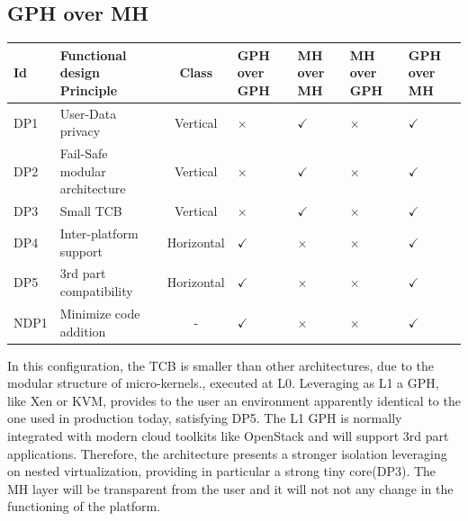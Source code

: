 \documentclass{sig-alternate}
\begin{document}
\subsection{GPH over MH}

\label{par:gom}

\begin{table}
\label{fin:conf}
\centering
\begin{tabular}{llcllll}
\toprule
Id & Functional design Principle & Class & GPH over GPH & MH over MH & MH over GPH & GPH over MH\\
\midrule
DP1 & User-Data privacy & Vertical & $\times$  & $\checkmark$ & $\times $ & $\checkmark$ \\
DP2 & Fail-Safe modular architecture & Vertical & $\times$  & $\checkmark$ & $\times$ & $\checkmark$ \\
DP3 & Small TCB & Vertical &  $\times$& $\checkmark$ & $\times$ & $\checkmark$ \\
DP4 & Inter-platform support & Horizontal & $\checkmark$  & $\times$ & $\times$ & $\checkmark$ \\
DP5 & 3rd part compatibility & Horizontal & $\checkmark$  & $\times$ & $\times$ & $\checkmark$ \\
NDP1 & Minimize code addition & - & $\checkmark$  & $\times$ & $\times$ & $\checkmark$ \\
\bottomrule
\end{tabular}
\end{table}

In this configuration, the TCB is smaller than other architectures, due to the modular structure of micro-kernels., executed at L0. Leveraging as L1 a GPH, like Xen or KVM, provides to the user an environment apparently  identical to the one used in production today, satisfying DP5. The L1 GPH is normally integrated with modern cloud toolkits like OpenStack and will support 3rd part applications.
Therefore, the architecture presents a stronger isolation leveraging on nested virtualization, providing in particular a strong tiny core(DP3). The MH layer will be transparent from the user and it will not not any change in the functioning of the platform.
\end{document}
